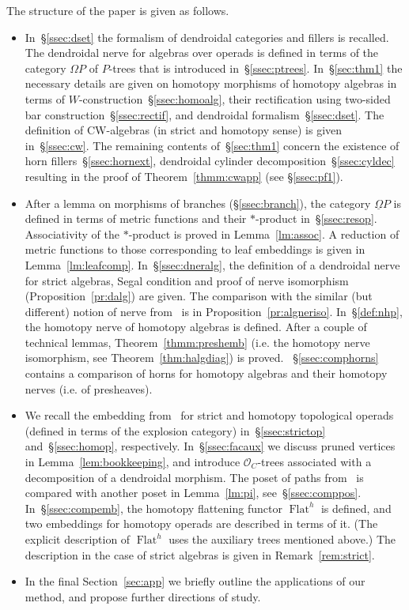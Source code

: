 \documentclass{amsart}
\theoremstyle{definition}
\theoremstyle{remark}
\DeclareMathOperator{\Flat}{Flat}
\begin{document}
	The structure of the paper is given as follows.
	\begin{itemize}
	\item In~\S\ref{ssec:dset} the formalism of dendroidal categories and fillers is recalled.
    The dendroidal nerve for algebras over operads is defined in terms of the category $\Omega P$ of $P$-trees that is introduced in~\S\ref{ssec:ptrees}.
    In~\S\ref{sec:thm1} the necessary details are given on homotopy morphisms of homotopy algebras in terms of $W$-construction~\S\ref{ssec:homoalg}, their rectification using two-sided bar construction~\S\ref{ssec:rectif}, and dendroidal formalism~\S\ref{ssec:dset}.
	The definition of CW-algebras (in strict and homotopy sense) is given in~\S\ref{ssec:cw}.
	The remaining contents of~\S\ref{sec:thm1} concern the existence of horn fillers~\S\ref{ssec:hornext}, dendroidal cylinder decomposition~\S\ref{ssec:cyldec} resulting in the proof of Theorem~\ref{thmm:cwapp} (see \S\ref{ssec:pf1}).
	\item After a lemma on morphisms of branches (\S\ref{ssec:branch}), the category $\underline{\Omega} P$ is defined in terms of metric functions and their $*$-product in~\S\ref{ssec:resop}.
	Associativity of the $*$-product is proved in Lemma~\ref{lm:assoc}.
	A reduction of metric functions to those corresponding to leaf embeddings is given in Lemma~\ref{lm:leafcomp}.
	In~\S\ref{ssec:dneralg}, the definition of a dendroidal nerve for strict algebras, Segal condition and proof of nerve isomorphism (Proposition~\ref{pr:dalg}) are given. 
	The comparison with the similar (but different) notion of nerve from~\cite{he-mo-22} is in Proposition~\ref{pr:algneriso}.
	In~\S\ref{def:nhp}, the homotopy nerve of homotopy algebras is defined.
	After a couple of technical lemmas, Theorem~\ref{thmm:preshemb} (i.e. the homotopy nerve isomorphism, see Theorem~\ref{thm:halgdiag}) is proved.
	~\S\ref{ssec:comphorns} contains a comparison of horns for homotopy algebras and their homotopy nerves (i.e. of presheaves).
	
	\item We recall the embedding from~\cite{clrrw-22} for strict and homotopy topological operads (defined in terms of the explosion category) in~\S\ref{ssec:strictop} and~\S\ref{ssec:homop}, respectively.
	In~\S\ref{ssec:facaux} we discuss pruned vertices in Lemma~\ref{lem:bookkeeping}, and introduce $\mathcal{O}_{C}$-trees associated with a decomposition of a dendroidal morphism. 
	The poset of paths from~\cite{clrrw-22} is compared with another poset in Lemma~\ref{lm:pi}, see~\S\ref{ssec:comppos}.
	In~\S\ref{ssec:compemb}, the homotopy flattening functor $\Flat^{h}$ is defined, and two embeddings for homotopy operads are described in terms of it.
	(The explicit description of $\Flat^h$ uses the auxiliary trees mentioned above.)
	The description in the case of strict algebras is given in Remark~\ref{rem:strict}.

	\item In the final Section~\ref{sec:app} we briefly outline the applications of our method, and propose further directions of study.
	\end{itemize}
	
\end{document}
